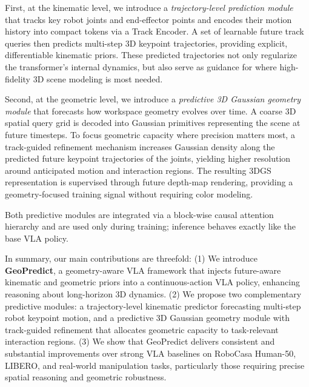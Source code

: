 First, at the kinematic level, we introduce a \emph{trajectory-level prediction module} that tracks key robot joints and end-effector points and encodes their motion history into compact tokens via a Track Encoder. A set of learnable future track queries then predicts multi-step 3D keypoint trajectories, providing explicit, differentiable kinematic priors. These predicted trajectories not only regularize the transformer's internal dynamics, but also serve as guidance for where high-fidelity 3D scene modeling is most needed.

Second, at the geometric level, we introduce a \emph{predictive 3D Gaussian geometry module} that forecasts how workspace geometry evolves over time. A coarse 3D spatial query grid is decoded into Gaussian primitives representing the scene at future timesteps. To focus geometric capacity where precision matters most, a track-guided refinement mechanism increases Gaussian density along the predicted future keypoint trajectories of the joints, yielding higher resolution around anticipated motion and interaction regions. The resulting 3DGS representation is supervised through future depth-map rendering, providing a geometry-focused training signal without requiring color modeling.

Both predictive modules are integrated via a block-wise causal attention hierarchy and are used only during training; inference behaves exactly like the base VLA policy.

In summary, our main contributions are threefold:
(1) We introduce \textbf{GeoPredict}, a geometry-aware VLA framework that injects future-aware kinematic and geometric priors into a continuous-action VLA policy, enhancing reasoning about long-horizon 3D dynamics.
(2) We propose two complementary predictive modules: a trajectory-level kinematic predictor forecasting multi-step robot keypoint motion, and a predictive 3D Gaussian geometry module with track-guided refinement that allocates geometric capacity to task-relevant interaction regions.
(3) We show that GeoPredict delivers consistent and substantial improvements over strong VLA baselines on RoboCasa Human-50, LIBERO, and real-world manipulation tasks, particularly those requiring precise spatial reasoning and geometric robustness.
